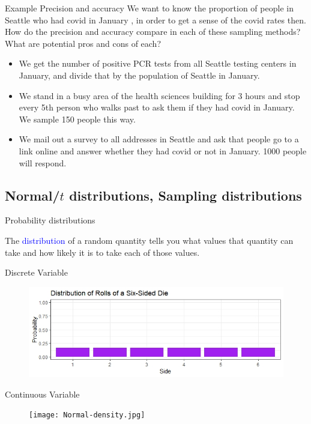\documentclass[10pt,t]{beamer}
\begin{document}
\begin{frame}{Example Precision and accuracy}
	We want to know the proportion of people in Seattle who had covid in January , in order to get a sense of the covid rates then. How do the precision and accuracy compare in each of these sampling methods? What are potential pros and cons of each?
	\medskip
	\begin{itemize}
		\item We get the number of positive PCR tests from all Seattle testing centers in January, and divide that by the population of Seattle in January.
		\medskip
		\item We stand in a busy area of the health sciences building for 3 hours and stop every 5th person who walks past to ask them if they had covid in January. We sample 150 people this way.
		\medskip
		\item We mail out a survey to all addresses in Seattle and ask that people go to a link online and answer whether they had covid or not in January. 1000 people will respond.
	\end{itemize}
	
	
\end{frame}

\subsection{Normal/$t$ distributions, Sampling distributions}

\begin{frame}{Probability distributions}
	
\vspace{-3 mm}	
	
	The \textcolor{blue}{distribution} of a random quantity tells you what values that quantity can take and how likely it is to take each of those values.
	\bigskip
	
	Discrete Variable
	\begin{figure}
	\centering \includegraphics[scale=0.35]{discrete_dist}
	\end{figure}
	\smallskip
	
	Continuous Variable
\begin{figure}
	\centering \texttt{[image: Normal-density.jpg]}
\end{figure}
\end{frame}
\end{document}
